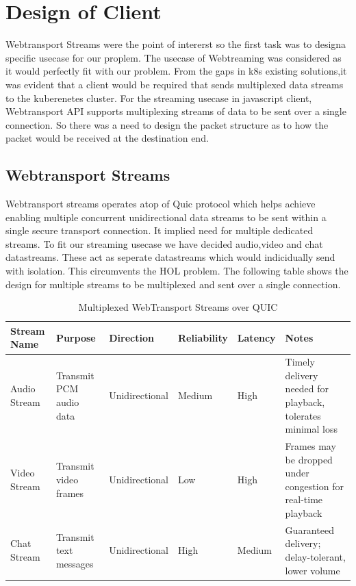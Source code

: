 {\section{Design of Client}
Webtransport Streams were the point of intererst so the first task was to designa  specific usecase for our proplem. The usecase of Webtreaming was considered as it would perfectly fit with our problem. From the gaps in k8s existing solutions,it was evident that a client would be required that sends multiplexed data streams to the kuberenetes cluster. For the streaming usecase in javascript client, Webtransport API supports multiplexing streams of data to be sent over a single connection. So there was a need to design the packet structure as to how the packet would be received at the destination end. 

\subsection{Webtransport Streams}
Webtransport streams operates atop of Quic protocol which helps achieve enabling multiple concurrent unidirectional data streams to be sent within a single secure transport connection. It implied need for multiple dedicated streams. To fit our streaming usecase we have decided audio,video and chat datastreams. These act as seperate datastreams which would indicidually send with isolation. This circumvents the HOL problem. The following table shows the design for multiple streams to be multiplexed and sent over a single connection.


\begin{table}[h!]
\renewcommand{\arraystretch}{0.9}
\small
\centering
\begin{tabularx}{\textwidth}{|l|X|l|l|l|X|}
\hline
\textbf{Stream Name} & \textbf{Purpose} & \textbf{Direction} & \textbf{Reliability} & \textbf{Latency} & \textbf{Notes} \\
\hline
Audio Stream & Transmit PCM audio data & Unidirectional & Medium & High & Timely delivery needed for playback, tolerates minimal loss \\
\hline
Video Stream & Transmit video frames & Unidirectional & Low & High & Frames may be dropped under congestion for real-time playback \\
\hline
Chat Stream & Transmit text messages & Unidirectional & High & Medium & Guaranteed delivery; delay-tolerant, lower volume \\
\hline
\end{tabularx}
\caption{Multiplexed WebTransport Streams over QUIC}
\label{tab:webtransport-streams}
\end{table}





}

